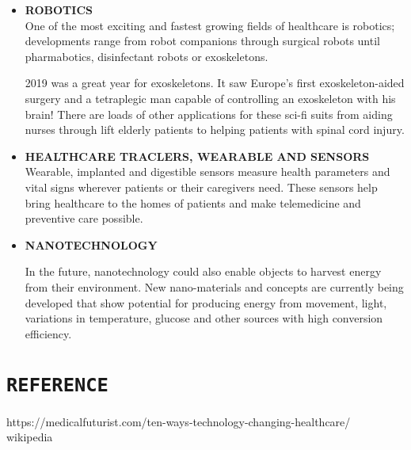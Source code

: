 \documentclass[12pt]{article}
\begin{document}
\begin{itemize}
\item\textbf{ROBOTICS}\\
One of the most exciting and fastest growing fields of healthcare is robotics; developments range from robot companions through surgical robots until pharmabotics, disinfectant robots or exoskeletons. 

2019 was a great year for exoskeletons. It saw Europe’s first exoskeleton-aided surgery and a tetraplegic man capable of controlling an exoskeleton with his brain! There are loads of other applications for these sci-fi suits from aiding nurses through lift elderly patients to helping patients with spinal cord injury.



\item\textbf{HEALTHCARE TRACLERS, WEARABLE AND SENSORS}\\
Wearable, implanted and digestible sensors measure health parameters and vital signs wherever patients or their caregivers need. These sensors help bring healthcare to the homes of patients and make telemedicine and preventive care possible.


\item\textbf{NANOTECHNOLOGY}

In the future, nanotechnology could also enable objects to harvest energy from their environment. New nano-materials and concepts are currently being developed that show potential for producing energy from movement, light, variations in temperature, glucose and other sources with high conversion efficiency.

\end{itemize}
\pagebreak

\section{\LARGE\centering\texttt{REFERENCE}}
https://medicalfuturist.com/ten-ways-technology-changing-healthcare/\\
wikipedia
\end{document}
